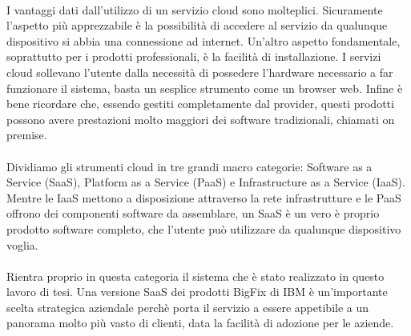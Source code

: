 \paragraph{}
I vantaggi dati dall'utilizzo di un servizio cloud sono molteplici. Sicuramente l'aspetto più apprezzabile è la possibilità di accedere al servizio da qualunque dispositivo si abbia una connessione ad internet. Un'altro aspetto fondamentale, soprattutto per i prodotti professionali, è la facilità di installazione. I servizi cloud sollevano l'utente dalla necessità di possedere l'hardware necessario a far funzionare il sistema, basta un sesplice strumento come un browser web. Infine è bene ricordare che, essendo gestiti completamente dal provider, questi prodotti possono avere prestazioni molto maggiori dei software tradizionali, chiamati on premise.
\paragraph{}
Dividiamo gli strumenti cloud in tre grandi macro categorie: Software as a Service (SaaS), Platform as a Service (PaaS) e Infrastructure as a Service (IaaS). Mentre le IaaS mettono a disposizione attraverso la rete infrastrutture e le PaaS offrono dei componenti software da assemblare, un SaaS è un vero è proprio prodotto software completo, che l'utente può utilizzare da qualunque dispositivo voglia.

\paragraph{}
Rientra proprio in questa categoria il sistema che è stato realizzato in questo lavoro di tesi. Una versione SaaS dei prodotti BigFix di IBM è un'importante scelta strategica aziendale perchè porta il servizio a essere appetibile a un panorama molto più vasto di clienti, data la facilità di adozione per le aziende.

